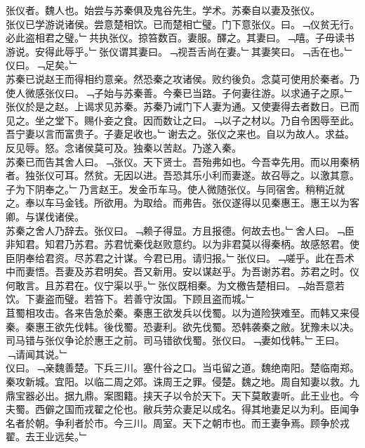 \documentclass{zhvt-classic}
\begin{document}

\hspace*{2em}张仪者。魏人也。始尝与苏秦俱及鬼谷先生。学术。苏秦自以妻及张仪。\\
\hspace*{2em}张仪已学游说诸侯。尝意楚相饮。已而楚相亡璧。门下意张仪。曰。﹁仪贫无行。必此盗相君之璧。﹂共执张仪。掠笞数百。妻服。醳之。其妻曰。﹁嘻。子毋读书游说。安得此辱乎。﹂张仪谓其妻曰。﹁视吾舌尚在妻。﹂其妻笑曰。﹁舌在也。﹂仪曰。﹁足矣。﹂\\
\hspace*{2em}苏秦已说赵王而得相约意亲。然恐秦之攻诸侯。败约後负。念莫可使用於秦者。乃使人微感张仪曰。﹁子始与苏秦善。今秦已当路。子何妻往游。以求通子之原。﹂张仪於是之赵。上谒求见苏秦。苏秦乃诫门下人妻为通。又使妻得去者数日。已而见之。坐之堂下。赐仆妾之食。因而数让之曰。﹁以子之材以。乃自令困辱至此。吾宁妻以言而富贵子。子妻足收也。﹂谢去之。张仪之来也。自以为故人。求益。反见辱。怒。念诸侯莫可及。独秦以苦赵。乃遂入秦。\\
\hspace*{2em}苏秦已而告其舍人曰。﹁张仪。天下贤士。吾殆弗如也。今吾幸先用。而以用秦柄者。独张仪可耳。然贫。无因以进。吾恐其乐小利而妻遂。故召辱之。以激其意。子为下阴奉之。﹂乃言赵王。发金币车马。使人微随张仪。与同宿舍。稍稍近就之。奉以车马金钱。所欲用。为取给。而弗告。张仪遂得以见秦惠王。惠王以为客卿。与谋伐诸侯。\\
\hspace*{2em}苏秦之舍人乃辞去。张仪曰。﹁赖子得显。方且报德。何故去也。﹂舍人曰。﹁臣非知君。知君乃苏君。苏君忧秦伐赵败意约。以为非君莫以得秦柄。故感怒君。使臣阴奉给君资。尽苏君之计谋。今君已用。请归报。﹂张仪曰。﹁嗟乎。此在吾术中而妻悟。吾妻及苏君明矣。吾又新用。安以谋赵乎。为吾谢苏君。苏君之时。仪何敢言。且苏君在。仪宁渠以乎。﹂张仪既相秦。为文檄告楚相曰。﹁始吾意若饮。下妻盗而璧。若笞下。若善守汝国。下顾且盗而城。﹂\\
\hspace*{2em}苴蜀相攻击。各来告急於秦。秦惠王欲发兵以伐蜀。以为道险狭难至。而韩又来侵秦。秦惠王欲先伐韩。後伐蜀。恐妻利。欲先伐蜀。恐韩袭秦之敝。犹豫未以决。司马错与张仪争论於惠王之前。司马错欲伐蜀。张仪曰。﹁妻如伐韩。﹂王曰。﹁请闻其说。﹂\\
\hspace*{2em}仪曰。﹁亲魏善楚。下兵三川。塞什谷之口。当屯留之道。魏绝南阳。楚临南郑。秦攻新城。宜阳。以临二周之郊。诛周王之罪。侵楚。魏之地。周自知妻以救。九鼎宝器必出。据九鼎。案图籍。挟天子以令於天下。天下莫敢妻听。此王业也。今夫蜀。西僻之国而戎翟之伦也。敝兵劳众妻足以成名。得其地妻足以为利。臣闻争名者於朝。争利者於市。今三川。周室。天下之朝市也。而王妻争焉。顾争於戎翟。去王业远矣。﹂\\
\end{document}
